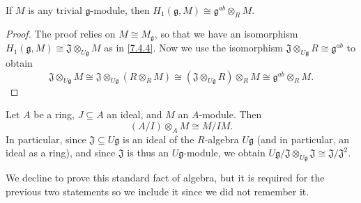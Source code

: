 \begin{corollary}\label{7.4.5}
	If $M$ is any trivial $\mathfrak{g} $-module, then $H_1(\mathfrak{g} ,M)\cong \mathfrak{g} ^{ab} \otimes _RM$.
\end{corollary}
\begin{proof}
	The proof relies on $M\cong M_\mathfrak{g} $, so that we have an isomorphism $H_1(\mathfrak{g} ,M)\cong \mathfrak{J} \otimes _{U\mathfrak{g} } M$ as in \cref{7.4.4}. Now we use the isomorphism $\mathfrak{J} \otimes _{U\mathfrak{g} } R \cong \mathfrak{g} ^{ab} $ to obtain
	\[
		\mathfrak{J} \otimes _{U\mathfrak{g} } M \cong \mathfrak{J} \otimes _{U\mathfrak{g} } (R\otimes _RM) \cong (\mathfrak{J} \otimes _{U\mathfrak{g} } R)\otimes _RM \cong \mathfrak{g} ^{ab} \otimes _RM
	.\]
\end{proof}
\begin{lemma}\label{7.4.6}
	Let $A$ be a ring, $J\subseteq A$ an ideal, and $M$ an $A$-module. Then
	\[
		(A/I)\otimes _AM \cong M/IM
	.\]
	In particular, since $\mathfrak{J} \subseteq U\mathfrak{g} $ is an ideal of the $R$-algebra $U\mathfrak{g} $ (and in particular, an ideal as a ring), and since $\mathfrak{J} $ is thus an $U\mathfrak{g} $-module, we obtain $U\mathfrak{g} /\mathfrak{J} \otimes _{U\mathfrak{g} } \mathfrak{J} \cong \mathfrak{J} /\mathfrak{J} ^2$.
\end{lemma}
We decline to prove this standard fact of algebra, but it is required for the previous two statements so we include it since we did not remember it.

